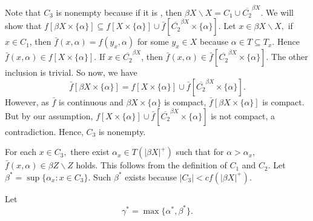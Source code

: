 \documentclass{article}
\begin{document}
																																				  Note that $C_3$ is nonempty because if it is , then $\beta X\backslash X= C_1\cup \overline{C_2}^{\beta X}.$ We will show that $f\left[\beta X\times \{\alpha\} \right] \subseteq f\left[X\times\{\alpha\}\right]\cup\bar{f}\left[\overline{C_2}^{\beta X}\times\{\alpha\}\right].$ Let $x\in\beta X\backslash X,$ if $x\in C_1$, then $\bar{f}(x,\alpha)=f(y_x,\alpha)$ for some $y_x\in X$ because $\alpha\in T\subseteq T_x.$ Hence $\bar{f}(x,\alpha)\in f\left[X\times\{\alpha\}\right].$ If $x\in \overline{C_2}^{\beta X}$, then $\bar{f}(x,\alpha)\in \bar{f}\left[\overline{C_2}^{\beta X}\times \{\alpha\}\right].$ 
																																				  The other inclusion is trivial. So now, we have 
																																				  $$\bar{f}\left[\beta X\times \{\alpha\}\right]=f\left[X\times\{\alpha\}\right]\cup\bar{f}\left[\overline{C_2}^{\beta X} \times \{\alpha\}\right].$$
																																				  However, as $\bar{f}$ is continuous and $\beta X\times \{\alpha\}$ is compact, $\bar{f}\left[\beta X\times \{\alpha\}\right]$ is compact. But by our assumption, $f\left[X\times\{\alpha\}\right] \cup \bar{f}\left[\overline{C_2}^{\beta X} \times \{\alpha\}\right] $ is not compact, a contradiction. Hence, $C_3$ is nonempty.

																																				  \vskip 20pt


																																				  For each $x\in C_3,$ there exist $\alpha_x\in T(|\beta X|^+)$ such that for $\alpha>\alpha_x$, $\bar{f}(x,\alpha)\in \beta Z\backslash Z$ holds. This follows from the definition of $C_1$ and $C_2$. Let $\beta^*=\sup\{\alpha_x: x\in C_3\}.$ Such $\beta^*$ exists because $|C_3|<cf(|\beta X|^+).$

																																				  Let $$\gamma^*=\max\{\alpha^*, \beta^*\}.$$
\end{document}
